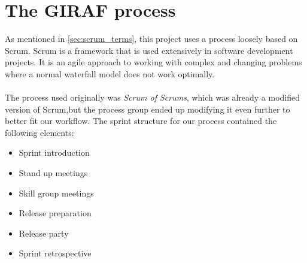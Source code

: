 \section{The GIRAF process}\label{the-giraf-process}
As mentioned in \autoref{sec:scrum_terms}, this project uses a process loosely based on Scrum. Scrum is a framework that is used extensively in software development projects.
It is an agile approach to working with complex and changing problems where a normal waterfall model does not work optimally.
\\\\
The process used originally was \textit{Scrum of Scrums}, which was already a modified version of Scrum,but the process group ended up modifying it even further to better fit our workflow.
The sprint structure for our process contained the following elements:

\begin{itemize}
    \item Sprint introduction
    \item Stand up meetings
    \item Skill group meetings
    \item Release preparation
    \item Release party
    \item Sprint retrospective
\end{itemize}

